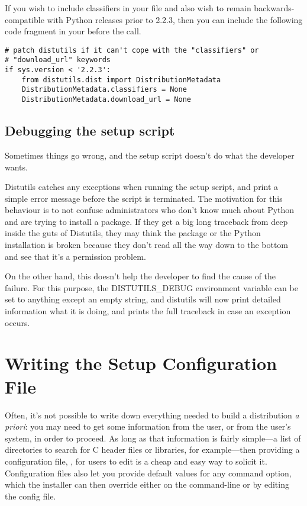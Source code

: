 \documentclass{manual}
\begin{document}
If you wish to include classifiers in your  file and also
wish to remain backwards-compatible with Python releases prior to 2.2.3,
then you can include the following code fragment in your 
before the  call.

\begin{verbatim}
# patch distutils if it can't cope with the "classifiers" or
# "download_url" keywords
if sys.version < '2.2.3':
    from distutils.dist import DistributionMetadata
    DistributionMetadata.classifiers = None
    DistributionMetadata.download_url = None
\end{verbatim}


\section{Debugging the setup script}

Sometimes things go wrong, and the setup script doesn't do what the
developer wants.

Distutils catches any exceptions when running the setup script, and
print a simple error message before the script is terminated.  The
motivation for this behaviour is to not confuse administrators who
don't know much about Python and are trying to install a package.  If
they get a big long traceback from deep inside the guts of Distutils,
they may think the package or the Python installation is broken
because they don't read all the way down to the bottom and see that
it's a permission problem.

On the other hand, this doesn't help the developer to find the cause
of the failure. For this purpose, the DISTUTILS_DEBUG environment
variable can be set to anything except an empty string, and distutils
will now print detailed information what it is doing, and prints the
full traceback in case an exception occurs.

\chapter{Writing the Setup Configuration File}
\label{setup-config}

Often, it's not possible to write down everything needed to build a
distribution \emph{a priori}: you may need to get some information from
the user, or from the user's system, in order to proceed.  As long as
that information is fairly simple---a list of directories to search for
C header files or libraries, for example---then providing a
configuration file, , for users to edit is a cheap and
easy way to solicit it.  Configuration files also let you provide
default values for any command option, which the installer can then
override either on the command-line or by editing the config file.
\end{document}
